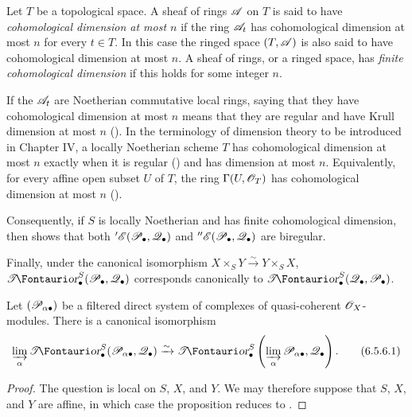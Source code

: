 \begin{env}[6.5.5]
\label{III.6.5.5}
Let $T$ be a topological space.  A sheaf of rings $\mathscr{A}$ on $T$
is said to have \emph{cohomological dimension at most $n$} if the
ring $\mathscr{A}_t$ has cohomological dimension at most $n$ for every
$t\in T$.  In this case the ringed space $(T,\mathscr{A})$ is also said
to have cohomological dimension at most $n$.  A sheaf of rings, or
a ringed space, has \emph{finite cohomological dimension} if this
holds for some integer $n$.

If the $\mathscr{A}_t$ are Noetherian commutative local rings, saying
that they have cohomological dimension at most $n$ means that
they are regular and have Krull dimension at most $n$
().  In the terminology of dimension theory to
be introduced in Chapter IV, a locally Noetherian scheme $T$ has
cohomological dimension at most $n$ exactly when it is regular
() and has dimension at most $n$.  Equivalently,
for every affine open subset $U$ of $T$, the ring
$\Gamma(U,\mathscr{O}_T)$ has cohomological dimension at most $n$
().

Consequently, if $S$ is locally Noetherian and has finite
cohomological dimension, then  shows that both
$'\mathscr{E}(\mathscr{P}_\bullet,\mathscr{Q}_\bullet)$ and
$''\mathscr{E}(\mathscr{P}_\bullet,\mathscr{Q}_\bullet)$ are biregular.

Finally, under the canonical isomorphism
$X\times_SY\xrightarrow{\sim}Y\times_SX$,
$\shTor_\bullet^S(\sh P_\bullet,\sh Q_\bullet)$ corresponds
canonically to
$\shTor_\bullet^S(\sh Q_\bullet,\sh P_\bullet)$.
\end{env}

\begin{proposition}[6.5.6]
\label{III.6.5.6}
Let $(\mathscr{P}_{\alpha\bullet})$ be a filtered direct system of
complexes of quasi-coherent $\mathscr{O}_X$-modules.  There is a
canonical isomorphism
\[
  \varinjlim_\alpha
  \shTor_\bullet^S(\sh P_{\alpha\bullet},\sh Q_\bullet)
  \xrightarrow{\sim}
  \shTor_\bullet^S
  \left(\varinjlim_\alpha\sh P_{\alpha\bullet},\sh Q_\bullet\right).
  \tag{6.5.6.1}\label{III.6.5.6.1}
\]
\end{proposition}

\begin{proof}
The question is local on $S$, $X$, and $Y$.  We may therefore
suppose that $S$, $X$, and $Y$ are affine, in which case the
proposition reduces to .
\end{proof}

